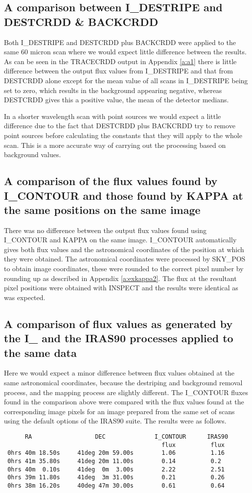 \subsection{A comparison between I\_DESTRIPE and DESTCRDD \& BACKCRDD}

Both I\_DESTRIPE and DESTCRDD plus BACKCRDD were applied to the same 60 micron
scan where we would expect little difference between the results. As can be 
seen in the TRACECRDD output in Appendix \ref{a:a1} there is little difference
between the output flux values from I\_DESTRIPE and that from DESTCRDD alone
except for the mean value of all scans in I\_DESTRIPE being set to zero, which
results in the background appearing negative, whereas DESTCRDD gives this a 
positive value, the mean of the detector medians. 

In a shorter wavelength scan with point sources we would expect a little
difference due to the fact that DESTCRDD plus BACKCRDD try to remove point
sources before calculating the  constants that they will apply to the whole 
scan. This is a  more accurate  way of carrying out the processing based on
background values.
\subsection{A comparison of the flux values found by I\_CONTOUR and those found
by KAPPA at the same positions on the same image}
There was no difference between the output flux values found using I\_CONTOUR
and KAPPA on the same image. I\_CONTOUR automatically gives both flux values
and the astronomical coordinates of the position at which they were obtained.
The astronomical coordinates were processed by SKY\_POS to obtain image
coordinates, these were rounded to the correct pixel number by rounding up as
described in Appendix \ref{a:exkappa2}. The flux at the resultant pixel
positions were obtained with INSPECT and the results were identical as was
expected.
\subsection{A comparison of flux values as generated by the I\_ and the IRAS90
processes applied to the same data}
Here we would expect a minor difference between flux values obtained at the
same astronomical coordinates, because the destriping and background removal
process, and the mapping process are slightly different.
The I\_CONTOUR fluxes found in the comparison above were compared with the flux
values found at the corresponding image pixels for an image prepared  from the 
same set of scans using the default options of the IRAS90 suite. The results
were as follows.
\begin{small}
\begin{verbatim}
      RA                  DEC              I_CONTOUR      IRAS90
                                             flux          flux
 0hrs 40m 18.50s     41deg 20m 59.00s        1.06          1.16        
 0hrs 41m 35.80s     41deg 20m 11.00s        0.14          0.2
 0hrs 40m  0.10s     41deg  0m  3.00s        2.22          2.51
 0hrs 39m 11.80s     41deg  3m 31.00s        0.21          0.26
 0hrs 38m 16.20s     40deg 47m 30.00s        0.61          0.64
\end{verbatim}
\end{small}
